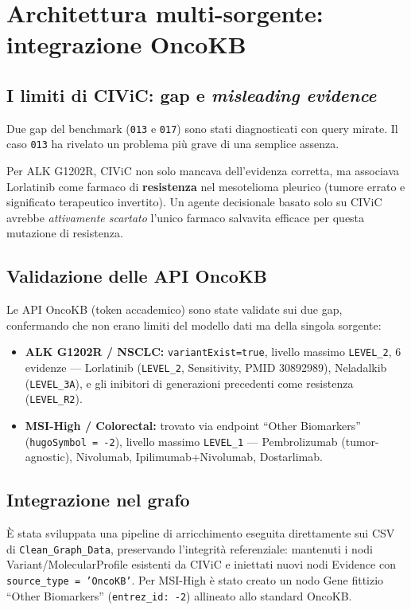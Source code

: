 \documentclass[11pt,a4paper]{article}
\newcommand{\code}[1]{\texttt{\small #1}}
\newcommand{\bench}[1]{\texttt{\small #1}}
\begin{document}
\section{Architettura multi-sorgente: integrazione OncoKB}

\subsection{I limiti di CIViC: gap e \emph{misleading evidence}}
Due gap del benchmark (\bench{013} e \bench{017}) sono stati diagnosticati con query mirate. Il caso \bench{013} ha rivelato un problema pi\`u grave di una semplice assenza.

\begin{warnbox}
Per ALK G1202R, CIViC non solo mancava dell'evidenza corretta, ma associava Lorlatinib come farmaco di \textbf{resistenza} nel mesotelioma pleurico (tumore errato e significato terapeutico invertito). Un agente decisionale basato solo su CIViC avrebbe \emph{attivamente scartato} l'unico farmaco salvavita efficace per questa mutazione di resistenza.
\end{warnbox}

\subsection{Validazione delle API OncoKB}
Le API OncoKB (token accademico) sono state validate sui due gap, confermando che non erano limiti del modello dati ma della singola sorgente:

\begin{itemize}
\item \textbf{ALK G1202R / NSCLC:} \code{variantExist=true}, livello massimo \code{LEVEL\_2}, 6 evidenze --- Lorlatinib (\code{LEVEL\_2}, Sensitivity, PMID 30892989), Neladalkib (\code{LEVEL\_3A}), e gli inibitori di generazioni precedenti come resistenza (\code{LEVEL\_R2}).
\item \textbf{MSI-High / Colorectal:} trovato via endpoint ``Other Biomarkers'' (\code{hugoSymbol = -2}), livello massimo \code{LEVEL\_1} --- Pembrolizumab (tumor-agnostic), Nivolumab, Ipilimumab+Nivolumab, Dostarlimab.
\end{itemize}

\subsection{Integrazione nel grafo}
\`E stata sviluppata una pipeline di arricchimento eseguita direttamente sui CSV di \code{Clean\_Graph\_Data}, preservando l'integrit\`a referenziale: mantenuti i nodi Variant/MolecularProfile esistenti da CIViC e iniettati nuovi nodi Evidence con \code{source\_type = 'OncoKB'}. Per MSI-High \`e stato creato un nodo Gene fittizio ``Other Biomarkers'' (\code{entrez\_id: -2}) allineato allo standard OncoKB.
\end{document}
